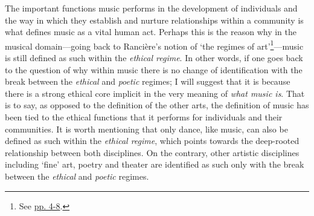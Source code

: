 The important functions music performs in the development of individuals and the way in which they establish and nurture relationships within a community is what defines music as a vital human act. Perhaps this is the reason why in the musical domain---going back to Ranci\`{e}re's notion of `the regimes of art'\footnote{See \hyperlink{artregimes}{pp. 4-8}.}---music is still defined as such within the \emph{ethical regime}. In other words, if one goes back to the question of why within music there is no change of identification with the break between the \emph{ethical} and \emph{poetic} regimes; I will suggest that it is because there is a strong ethical core implicit in the very meaning of \emph{what music is}. That is to say, as opposed to the definition of the other arts, the definition of music has been tied to the ethical functions that it performs for individuals and their communities. It is worth mentioning that only dance, like music, can also be defined as such within the \emph{ethical regime}, which points towards the deep-rooted relationship between both disciplines. On the contrary, other artistic disciplines including `fine' art, poetry and theater are identified as such only with the break between the \emph{ethical} and \emph{poetic} regimes.   

